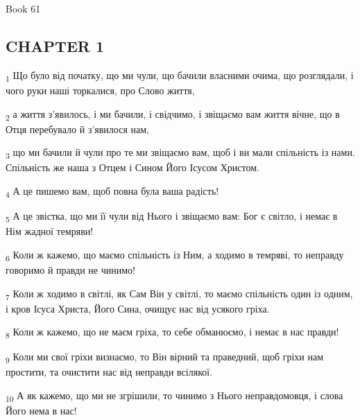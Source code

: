 Book 61
\subsection{CHAPTER 1}
\begin{tcolorbox}
\textsubscript{1} Що було від початку, що ми чули, що бачили власними очима, що розглядали, і чого руки наші торкалися, про Слово життя,
\end{tcolorbox}
\begin{tcolorbox}
\textsubscript{2} а життя з'явилось, і ми бачили, і свідчимо, і звіщаємо вам життя вічне, що в Отця перебувало й з'явилося нам,
\end{tcolorbox}
\begin{tcolorbox}
\textsubscript{3} що ми бачили й чули про те ми звіщаємо вам, щоб і ви мали спільність із нами. Спільність же наша з Отцем і Сином Його Ісусом Христом.
\end{tcolorbox}
\begin{tcolorbox}
\textsubscript{4} А це пишемо вам, щоб повна була ваша радість!
\end{tcolorbox}
\begin{tcolorbox}
\textsubscript{5} А це звістка, що ми її чули від Нього і звіщаємо вам: Бог є світло, і немає в Нім жадної темряви!
\end{tcolorbox}
\begin{tcolorbox}
\textsubscript{6} Коли ж кажемо, що маємо спільність із Ним, а ходимо в темряві, то неправду говоримо й правди не чинимо!
\end{tcolorbox}
\begin{tcolorbox}
\textsubscript{7} Коли ж ходимо в світлі, як Сам Він у світлі, то маємо спільність один із одним, і кров Ісуса Христа, Його Сина, очищує нас від усякого гріха.
\end{tcolorbox}
\begin{tcolorbox}
\textsubscript{8} Коли ж кажемо, що не маєм гріха, то себе обманюємо, і немає в нас правди!
\end{tcolorbox}
\begin{tcolorbox}
\textsubscript{9} Коли ми свої гріхи визнаємо, то Він вірний та праведний, щоб гріхи нам простити, та очистити нас від неправди всілякої.
\end{tcolorbox}
\begin{tcolorbox}
\textsubscript{10} А як кажемо, що ми не згрішили, то чинимо з Нього неправдомовця, і слова Його нема в нас!
\end{tcolorbox}
